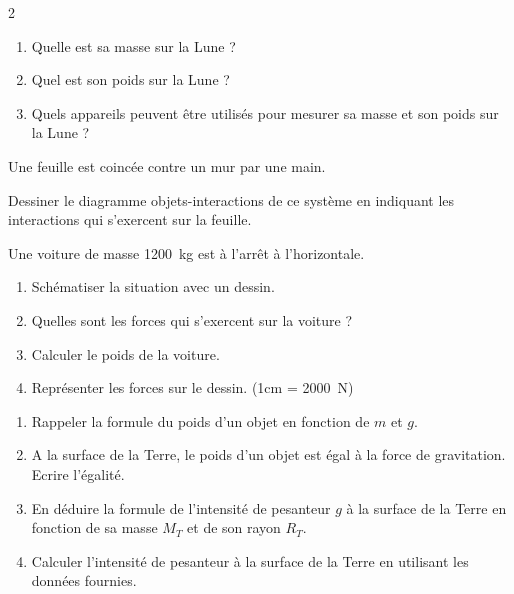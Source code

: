 \documentclass[11pt,a5paper,landscape]{article}
\begin{document}
\begin{multicols*}{2}

\begin{enumerate}[label=\alph*)]
    \item Quelle est sa masse sur la Lune ? 
    \item Quel est son poids sur la Lune ?
    \item Quels appareils peuvent être utilisés pour mesurer sa masse et son poids sur la Lune ?
\end{enumerate}



Une feuille est coincée contre un mur par une main.

Dessiner le diagramme objets-interactions de ce système en indiquant les interactions qui s'exercent sur la feuille.


Une voiture de masse \SI{1200}{kg} est à l'arrêt à l'horizontale.

\begin{enumerate}[label=\alph*)]
    \item Schématiser la situation avec un dessin.
    \item Quelles sont les forces qui s'exercent sur la voiture ?
    \item Calculer le poids de la voiture.
    \item Représenter les forces sur le dessin. (1cm = \SI{2000}{N})
\end{enumerate}


\begin{enumerate}[label=\alph*)]
    \item Rappeler la formule du poids d'un objet en fonction de $m$ et $g$.
    \item A la surface de la Terre, le poids d'un objet est égal à la force de gravitation. Ecrire l'égalité.
    \item En déduire la formule de l'intensité de pesanteur $g$ à la surface de la Terre en fonction de sa masse $M_T$ et de son rayon $R_T$.
    \item Calculer l'intensité de pesanteur à la surface de la Terre en utilisant les données fournies.
\end{enumerate}

\end{multicols*}
\end{document}
